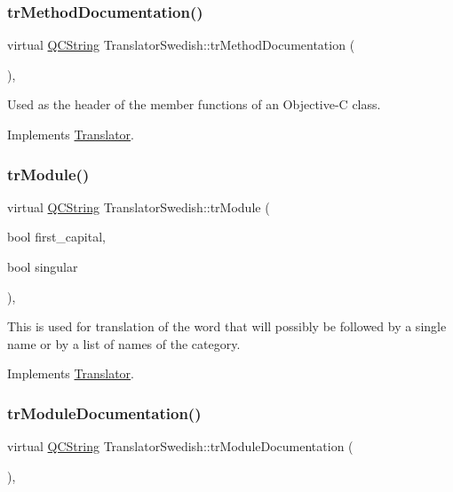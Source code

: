 \subsubsection{\texorpdfstring{trMethodDocumentation()}{trMethodDocumentation()}}
{\footnotesize\ttfamily virtual \mbox{\hyperlink{class_q_c_string}{Q\+C\+String}} Translator\+Swedish\+::tr\+Method\+Documentation (\begin{DoxyParamCaption}{ }\end{DoxyParamCaption})\hspace{0.3cm}{\ttfamily [inline]}, {\ttfamily [virtual]}}

Used as the header of the member functions of an Objective-\/C class. 

Implements \mbox{\hyperlink{class_translator}{Translator}}.

\mbox{\label{class_translator_swedish_a081eed26a5fb7b222d6359c37cb02543}} 
\subsubsection{\texorpdfstring{trModule()}{trModule()}}
{\footnotesize\ttfamily virtual \mbox{\hyperlink{class_q_c_string}{Q\+C\+String}} Translator\+Swedish\+::tr\+Module (\begin{DoxyParamCaption}\item[{bool}]{first\+\_\+capital,  }\item[{bool}]{singular }\end{DoxyParamCaption})\hspace{0.3cm}{\ttfamily [inline]}, {\ttfamily [virtual]}}

This is used for translation of the word that will possibly be followed by a single name or by a list of names of the category. 

Implements \mbox{\hyperlink{class_translator}{Translator}}.

\mbox{\label{class_translator_swedish_a4c58cbdfe92a7da98c075d22f1ed3b1f}} 
\subsubsection{\texorpdfstring{trModuleDocumentation()}{trModuleDocumentation()}}
{\footnotesize\ttfamily virtual \mbox{\hyperlink{class_q_c_string}{Q\+C\+String}} Translator\+Swedish\+::tr\+Module\+Documentation (\begin{DoxyParamCaption}{ }\end{DoxyParamCaption})\hspace{0.3cm}{\ttfamily [inline]}, {\ttfamily [virtual]}}

